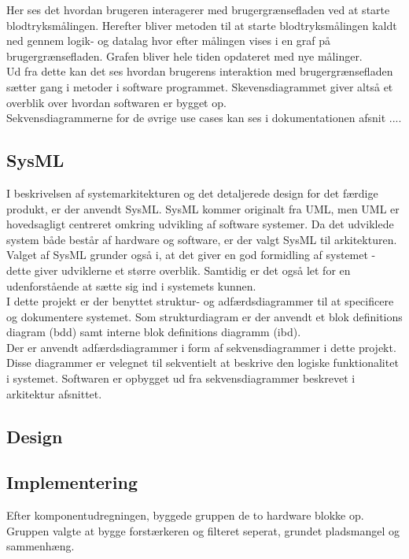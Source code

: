 Her ses det hvordan brugeren interagerer med brugergrænsefladen ved at starte blodtryksmålingen. Herefter bliver metoden til at starte blodtryksmålingen kaldt ned gennem logik- og datalag hvor efter målingen vises i en graf på brugergrænsefladen. Grafen bliver hele tiden opdateret med nye målinger.\\
Ud fra dette kan det ses hvordan brugerens interaktion med brugergrænsefladen sætter gang i metoder i software programmet. Skevensdiagrammet giver altså et overblik over hvordan softwaren er bygget op.\\
Sekvensdiagrammerne for de øvrige use cases kan ses i dokumentationen afsnit ....
  
 \subsection{SysML}
 I beskrivelsen af systemarkitekturen og det detaljerede design for det færdige produkt, er der 
anvendt SysML. SysML kommer originalt fra UML, men UML er hovedsagligt centreret omkring udvikling af software systemer. Da det udviklede system både består af hardware og software, er der valgt SysML til arkitekturen.\\
Valget af SysML grunder også i, at det giver en god formidling af systemet - dette giver udviklerne et større overblik. Samtidig er det også let for en udenforstående at sætte sig ind i systemets kunnen.\\

I dette projekt er der benyttet struktur- og adfærdsdiagrammer til at specificere og 
dokumentere systemet. Som strukturdiagram er der anvendt et blok definitions diagram (bdd) samt interne blok definitions diagramm (ibd).\\
Der er anvendt adfærdsdiagrammer i form af sekvensdiagrammer i dette projekt. Disse 
diagrammer er velegnet til sekventielt at beskrive den logiske funktionalitet i systemet.
Softwaren er opbygget ud fra sekvensdiagrammer beskrevet i arkitektur afsnittet. 



\subsection{Design}


\subsection{Implementering}
Efter komponentudregningen, byggede gruppen de to hardware blokke op. Gruppen valgte at bygge forstærkeren og filteret seperat, grundet pladsmangel og sammenhæng.\\

